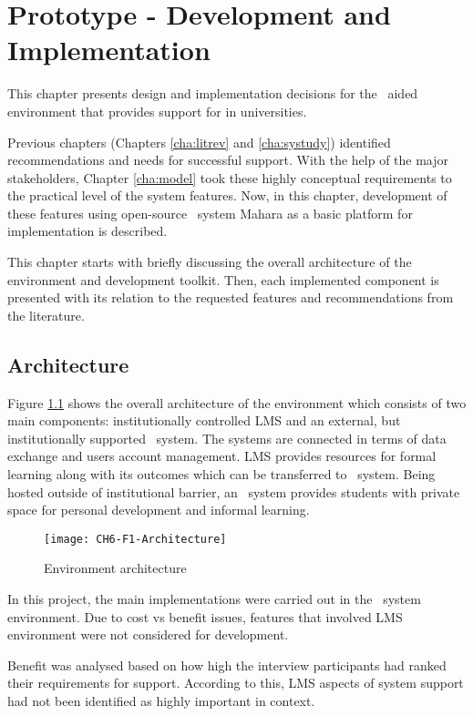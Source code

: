 \chapter{Prototype - Development and Implementation\label{cha:prototype}}
This chapter presents design and implementation decisions for the \ep~aided
environment that provides support for \LLLs in universities.

Previous chapters (Chapters \ref{cha:litrev} and \ref{cha:systudy}) identified
recommendations and needs for successful \LLLs support. With the help of the
major stakeholders, Chapter \ref{cha:model} took these highly conceptual
requirements to the practical level of the system features. Now, in this
chapter, development of these features using open-source \ep~system Mahara as a
basic platform for implementation is described.

This chapter starts with briefly discussing the overall architecture of the
environment and development toolkit. Then, each implemented component is
presented with its relation to the requested features and \LLLs recommendations
from the literature.

\section{Architecture}

Figure \ref{fig:arch} shows the overall architecture of the environment which
consists of two main components: institutionally controlled LMS and an external,
but institutionally supported \ep~system. The systems are connected in terms of
data exchange and users account management. LMS provides resources for formal
learning along with its outcomes which can be transferred to \ep~system. Being
hosted outside of institutional barrier, an \ep~system provides students with
private space for personal development and informal learning.

\begin{figure}[htp]
\centering
\texttt{[image: CH6-F1-Architecture]}
\caption{Environment architecture}
\label{fig:arch}
\end{figure}

In this project, the main implementations were carried out in the \ep~system
environment. Due to cost vs benefit issues, features that involved LMS
environment were not considered for development. 

Benefit was analysed based on how high the interview participants had ranked
their requirements for \LLLs support. According to this, LMS aspects of system
support had not been identified as highly important in \LLLs context. 

